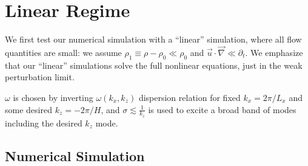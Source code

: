 \documentclass[twocolumn,
        nofootinbib,
        usenames, %
        dvipsnames %
    ]{revtex4-1}%
\begin{document}
\section{Linear Regime}\label{s:lin}

We first test our numerical simulation with a ``linear'' simulation, where
all flow quantities are small: we assume  $\rho_1 \equiv \rho - \rho_0 \ll
\rho_0$ and $\vec{u} \cdot \vec{\nabla} \ll \partial_t$. We emphasize that our
``linear'' simulations solve the full nonlinear equations, just in the weak
perturbation limit.

$\omega$ is chosen by inverting $\omega(k_x, k_z)$ dispersion relation for fixed
$k_x = 2\pi / L_x$ and some desired $k_z = -2\pi/H$, and $\sigma \lesssim
\frac{1}{k_z}$ is used to excite a broad band of modes including the desired
$k_z$ mode.

\subsection{Numerical Simulation}\label{ss:lin_ns}
\end{document}
